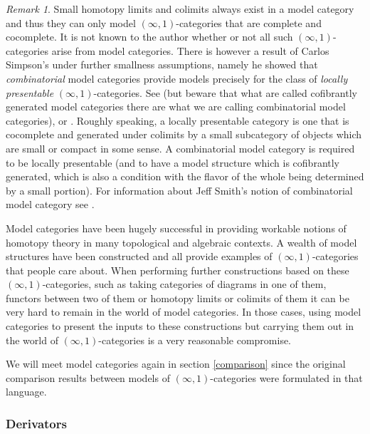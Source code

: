 \documentclass[12pt]{amsart}
\theoremstyle{definition} \newtheorem{definition}[theorem]{Definition}
\theoremstyle{remark} \newtheorem{remark}[theorem]{Remark}
\numberwithin{equation}{section}
\newcommand{\oo}{\infty}
\newcommand{\io}{$(\oo,1)$}
\begin{document}
\begin{remark}
  Small homotopy limits and colimits always exist in a model category
  and thus they can only model \io-categories that are complete and
  cocomplete. It is not known to the author whether or not all such
  \io-categories arise from model categories. There is however a
  result of Carlos Simpson's under further smallness assumptions,
  namely he showed that \emph{combinatorial} model categories provide
  models precisely for the class of \emph{locally presentable}
  \io-categories.  See \cite{SimpsonPres} (but beware that what are
  called cofibrantly generated model categories there are what we are
  calling combinatorial model categories), or \cite[Section
  5.5.1]{HTT}. Roughly speaking, a locally presentable category is one
  that is cocomplete and generated under colimits by a small
  subcategory of objects which are small or compact in some sense. A
  combinatorial model category is required to be locally presentable
  (and to have a model structure which is cofibrantly generated, which
  is also a condition with the flavor of the whole being determined by
  a small portion). For information about Jeff Smith's notion of
  combinatorial model category see \cite[Appendix A.2.6]{HTT}.
\end{remark}

Model categories have been hugely successful in providing workable
notions of homotopy theory in many topological and algebraic contexts.
A wealth of model structures have been constructed and all provide
examples of \io-categories that people care about. When performing
further constructions based on these \io-categories, such as taking
categories of diagrams in one of them, functors between two of them or
homotopy limits or colimits of them it can be very hard to remain in
the world of model categories. In those cases, using model categories
to present the inputs to these constructions but carrying them out in
the world of \io-categories is a very reasonable compromise.

We will meet model categories again in section \ref{comparison} since
the original comparison results between models of \io-categories were
formulated in that language.

\subsubsection{Derivators}
\end{document}
